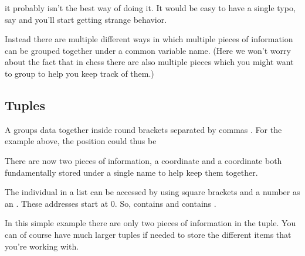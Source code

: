 \documentclass[letterpaper,10pt,british]{sphinxmanual}
\begin{document}
\sphinxAtStartPar
it probably isn’t the best way of doing it. It would be easy to have a single typo, say  and you’ll start getting strange behavior.

\sphinxAtStartPar
Instead there are multiple different ways in which multiple pieces of information can be grouped together under a common variable name. (Here we won’t worry about the fact that in chess there are also multiple pieces which you might want to group to help you keep track of them.)


\subsection{Tuples}
\label{\detokenize{chapters/programming_fundamentals/variables:tuples}}
\sphinxAtStartPar
A  groups data together inside round brackets  separated by commas . For the example above, the position could thus be

\begin{sphinxVerbatim}[commandchars=\\\{\}]
   
\end{sphinxVerbatim}

\sphinxAtStartPar
There are now two pieces of information, a  coordinate and a  coordinate both fundamentally stored under a single name to help keep them together.

\sphinxAtStartPar
The individual  in a list can be accessed by using square brackets  and a number as an . These addresses start at 0. So,  contains  and  contains .

\sphinxAtStartPar
In this simple example there are only two pieces of information in the tuple. You can of course have much larger tuples if needed to store the different items that you’re working with.
\end{document}
